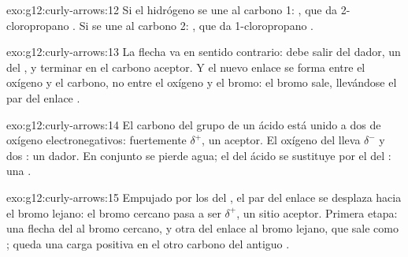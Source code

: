 \begin{solution}{exo:g12:curly-arrows:12}
Si el hidrógeno se une al carbono 1: , que da
2-cloropropano . Si se une al carbono 2:
, que da 1-cloropropano .
\end{solution}

\begin{solution}{exo:g12:curly-arrows:13}
La flecha va en sentido contrario: debe salir del dador, un  del
, y terminar en el carbono aceptor. Y el nuevo enlace se forma
entre el oxígeno y el carbono, no entre el oxígeno y el bromo: el bromo
sale, llevándose el par del enlace .
\end{solution}

\begin{solution}{exo:g12:curly-arrows:14}
El carbono del grupo  de un ácido está unido a dos  de
oxígeno electronegativos: fuertemente $\delta^+$, un aceptor. El oxígeno
del  lleva $\delta^-$ y dos : un dador. En conjunto
se pierde agua; el  del ácido se sustituye por el  del
: una .
\end{solution}

\begin{solution}{exo:g12:curly-arrows:15}
Empujado por los  del , el par del enlace
 se desplaza hacia el bromo lejano: el bromo cercano pasa a ser
$\delta^+$, un sitio aceptor. Primera etapa: una flecha del 
al bromo cercano, y otra del enlace  al bromo lejano, que sale
como ; queda una carga positiva en el otro carbono del antiguo
.
\end{solution}

